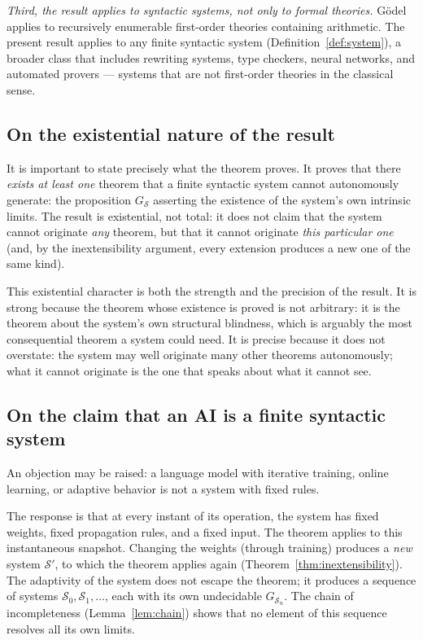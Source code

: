\documentclass[11pt]{article}
\begin{document}
\emph{Third, the result applies to syntactic systems, not only to formal
theories.} G\"odel applies to recursively enumerable first-order
theories containing arithmetic. The present result applies to any finite
syntactic system (Definition~\ref{def:system}), a broader class that
includes rewriting systems, type checkers, neural networks, and
automated provers --- systems that are not first-order theories in the
classical sense.

\subsection{On the existential nature of the result}

It is important to state precisely what the theorem proves. It proves
that there \emph{exists at least one} theorem that a finite syntactic
system cannot autonomously generate: the proposition $G_{\mathcal{S}}$
asserting the existence of the system's own intrinsic limits. The result
is existential, not total: it does not claim that the system cannot
originate \emph{any} theorem, but that it cannot originate \emph{this
particular one} (and, by the inextensibility argument, every extension
produces a new one of the same kind).

This existential character is both the strength and the precision of the
result. It is strong because the theorem whose existence is proved is
not arbitrary: it is the theorem about the system's own structural
blindness, which is arguably the most consequential theorem a system
could need. It is precise because it does not overstate: the system may
well originate many other theorems autonomously; what it cannot originate
is the one that speaks about what it cannot see.

\subsection{On the claim that an AI is a finite syntactic system}

An objection may be raised: a language model with iterative training,
online learning, or adaptive behavior is not a system with fixed rules.

The response is that at every instant of its operation, the system has
fixed weights, fixed propagation rules, and a fixed input. The theorem
applies to this instantaneous snapshot. Changing the weights (through
training) produces a \emph{new} system $\mathcal{S}'$, to which the
theorem applies again (Theorem~\ref{thm:inextensibility}). The
adaptivity of the system does not escape the theorem; it produces a
sequence of systems $\mathcal{S}_0, \mathcal{S}_1, \ldots$, each with
its own undecidable $G_{\mathcal{S}_n}$. The chain of incompleteness
(Lemma~\ref{lem:chain}) shows that no element of this sequence resolves
all its own limits.
\end{document}
